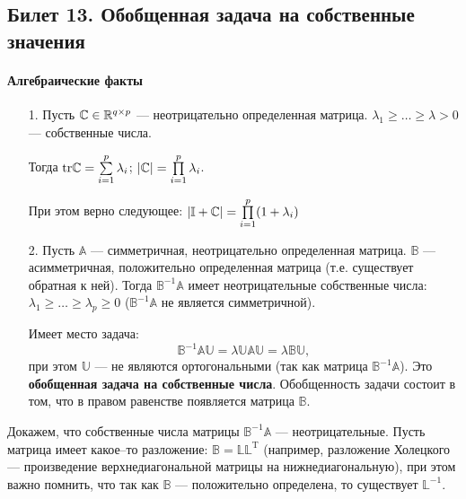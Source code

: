 \subsection{Билет 13. Обобщенная задача на собственные значения}
\paragraph{Алгебраические факты}
\begin{itemize}
\item[1.] Пусть $\mathbb{C} \in \mathbb{R}^{q \times p}$ --- неотрицательно определенная матрица. $\lambda_1 \geq \dots \geq \lambda > 0$ --- собственные числа.

Тогда $\mathrm {tr} \mathbb{C} = \sum \limits_{i = 1}^{p} \lambda_i$; $|\mathbb{C}| = \prod \limits_{i = 1}^p \lambda_i$.

При этом верно следующее: $|\mathbb{I} + \mathbb{C}| = \prod \limits_{i = 1}^p (1 + \lambda_i)$
\item[2.] Пусть $\mathbb{A}$ --- симметричная, неотрицательно определенная матрица. $\mathbb{B}$ --- асимметричная, положительно определенная матрица (т.е. существует обратная к ней). 
Тогда $\mathbb{B}^{-1}\mathbb{A}$ имеет неотрицательные собственные числа: $\lambda_1 \geq \dots \geq \lambda_p \geq 0$ ($\mathbb{B}^{-1}\mathbb{A}$ не является симметричной).

Имеет место задача:
%
\begin{equation*}
\mathbb{B}^{-1}\mathbb{A}\mathbb{U} = \lambda \mathbb{U} \mathbb{A}\mathbb{U} = \lambda \mathbb{B} \mathbb{U},
\end{equation*}
%
при этом $\mathbb{U}$ --- не являются ортогональными (так как матрица $\mathbb{B}^{-1}\mathbb{A}$). Это \textbf{обобщенная задача на собственные числа}. Обобщенность задачи состоит в том, что в правом равенстве появляется матрица $\mathbb{B}$. 
\end{itemize}

Докажем, что собственные числа матрицы $\mathbb{B}^{-1}\mathbb{A}$ --- неотрицательные.
Пусть матрица имеет какое--то разложение: $\mathbb{B} = \mathbb{L}\mathbb{L}^{\mathrm{T}}$ (например, разложение Холецкого --- произведение верхнедиагональной матрицы на нижнедиагональную), при этом важно помнить, что так как $\mathbb{B}$ --- положительно определена, то существует $\mathbb{L}^{-1}$.

